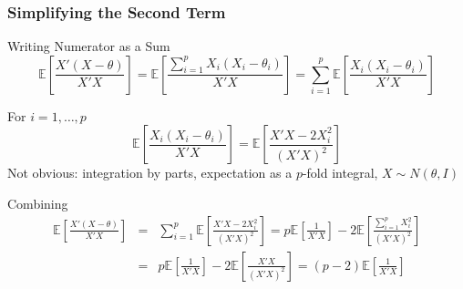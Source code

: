 \begin{frame}
  \frametitle{Simplifying the Second Term}

  \footnotesize
  \begin{block}{Writing Numerator as a Sum}
    \vspace{-0.5em}
\begin{equation*}
  \mathbb{E}\left[ \frac{X'(X-\theta)}{X'X} \right] = \mathbb{E}\left[ \frac{\sum_{i=1}^{p} X_i\left( X_i - \theta_i \right)}{X'X} \right] = \sum_{i=1}^{p} \mathbb{E}\left[ \frac{X_i(X_i - \theta_i)}{X'X} \right]
\end{equation*}
  \end{block}

  \begin{block}{For $i = 1, \dots, p$}
    \vspace{-0.5em}
    \begin{equation*}    
      \mathbb{E}\left[ \frac{X_i(X_i - \theta_i)}{X'X} \right] = \mathbb{E}\left[ \frac{X'X - 2 X_i^2}{\left( X'X \right)^2} \right]
\end{equation*}
Not obvious: integration by parts, expectation as a $p$-fold integral, $X\sim N(\theta, I)$ 
  \end{block}

  \begin{block}{Combining}
    \vspace{-0.5em}
\begin{eqnarray*}
  \mathbb{E}\left[ \frac{X'(X-\theta)}{X'X} \right] &=&  \sum_{i=1}^{p} \mathbb{E}\left[ \frac{X'X - 2 X_i^2}{\left( X'X \right)^2} \right] = p \mathbb{E}\left[ \frac{1}{X'X} \right] - 2 \mathbb{E}\left[ \frac{\sum_{i=1}^{p} X_i^2}{(X'X)^2} \right]\\
  &=& p \mathbb{E}\left[ \frac{1}{X'X} \right] - 2 \mathbb{E}\left[ \frac{X'X}{(X'X)^2} \right] = \left( p-2 \right)\mathbb{E}\left[ \frac{1}{X'X} \right]
\end{eqnarray*}
    
  \end{block}

\end{frame}
